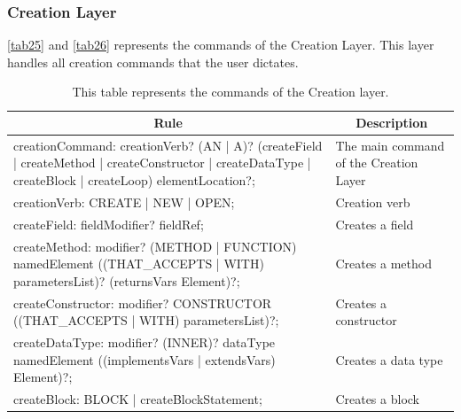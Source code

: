 \subsubsection{Creation Layer}
\autoref{tab25} and \autoref{tab26} represents the commands of the Creation Layer. This layer handles all creation commands that the user dictates.
\begin{table}[H]
	\centering
	\begin{tabular}{|p{8cm}|p{7cm}|}
		\hline
		\multicolumn{1}{|c|}{{\bf Rule}} & \multicolumn{1}{c|}{{\bf Description}} \\ \hline
		creationCommand: creationVerb? (AN | A)? (createField | createMethod | createConstructor | createDataType | createBlock | createLoop) elementLocation?; & The main command of the Creation Layer \\ \hline
		creationVerb: CREATE | NEW | OPEN; & Creation verb                          \\ \hline
		createField: fieldModifier? fieldRef; & Creates a field                        \\ \hline
		createMethod: modifier? (METHOD | FUNCTION) namedElement ((THAT\_ACCEPTS | WITH) parametersList)? (returnsVars Element)?;                               & Creates a method                       \\ \hline
		createConstructor: modifier? CONSTRUCTOR ((THAT\_ACCEPTS | WITH) parametersList)?;                                                                      & Creates a constructor                  \\ \hline
		createDataType: modifier? (INNER)? dataType namedElement ((implementsVars | extendsVars) Element)?;                                                     & Creates a data type                    \\ \hline
		createBlock: BLOCK | createBlockStatement;                                                                                                              & Creates a block                        \\ \hline
	\end{tabular}
	\caption{This table represents the commands of the Creation layer.}
	\label{tab25}
\end{table}


